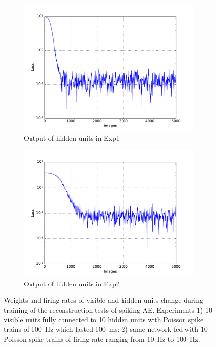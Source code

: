 \begin{figure}
\begin{subfigure}[t]{0.4\textwidth}
		\includegraphics[width=\textwidth]{pics_sdlm/07_exp_SAE_all_long/exp1_mse_nons.pdf}
		\caption{Output of hidden units in Exp1}
	\end{subfigure}
	\begin{subfigure}[t]{0.4\textwidth}
		\includegraphics[width=\textwidth]{pics_sdlm/07_exp_SAE_all_long/exp2_mse_nons.pdf}
		\caption{Output of hidden units in Exp2}
	\end{subfigure}
	\caption{Weights and firing rates of visible and hidden units change during training of the reconstruction tests of spiking AE. 
		Experiments 1) 10 visible units fully connected to 10 hidden units with Poisson spike trains of 100~Hz which lasted 100~ms; 2) same network fed with 10 Poisson spike trains of firing rate ranging from 10~Hz to 100~Hz.}
\end{figure}

